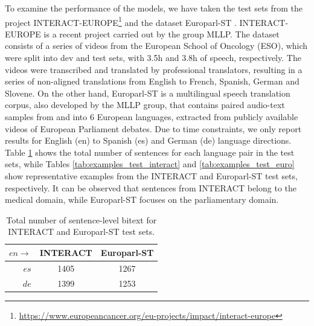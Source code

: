 \documentclass[11pt,english,listoffigures,listoftables]{tfgetsinf}
\begin{document}
To examine the performance of the models, we have taken the test sets from the project INTERACT-EUROPE\footnote{\url{https://www.europeancancer.org/eu-projects/impact/interact-europe}} and the dataset Europarl-ST \cite{iranzo2020europarl}. INTERACT-EUROPE is a recent project carried out by the group MLLP. The dataset consists of a series of videos from the European School of Oncology (ESO), which were split into dev and test sets, with 3.5h and 3.8h of speech, respectively. The videos were transcribed and translated by professional translators, resulting in a series of non-aligned translations from English to French, Spanish, German and Slovene. On the other hand, Europarl-ST is a multilingual speech translation corpus, also developed by the MLLP group, that contains paired audio-text samples from and into 6 European languages, extracted from publicly available videos of European Parliament debates. Due to time constraints, we only report results for English (en) to Spanish (es) and German (de) language directions. Table \ref{table:test-datasets} shows the total number of sentences for each language pair in the test sets, while Tables \ref{tab:examples_test_interact} and \ref{tab:examples_test_euro} show representative examples from the INTERACT and Europarl-ST test sets, respectively. It can be observed that sentences from INTERACT belong to the medical domain, while Europarl-ST focuses on the parliamentary domain.


\begin{table}[h]
    \centering
	\caption{Total number of sentence-level bitext for INTERACT and Europarl-ST test sets.} 
	\begin{tabular}{r||cc}
	       $en \rightarrow$ & INTERACT & Europarl-ST \\ \hline
		   $es$  & 1405 & 1267  \\ 
		   $de$  & 1399 & 1253  \\
	\end{tabular} 
    \label{table:test-datasets}
\end{table}
\end{document}
